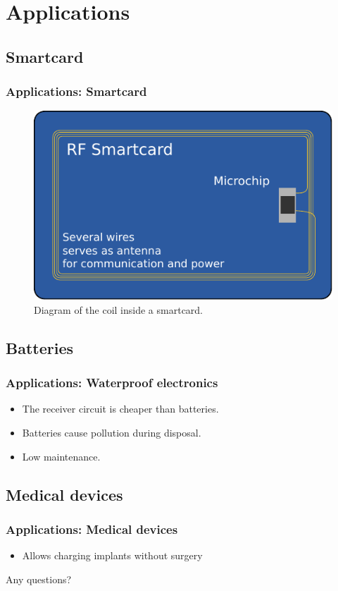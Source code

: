 \documentclass{beamer}
\begin{document}
\section{Applications}

\subsection{Smartcard}
\begin{frame}
  \frametitle{Applications: Smartcard}
    \begin{figure}
      \includegraphics[scale=0.75]{images/smartcard.pdf}
      \caption{Diagram of the coil inside a smartcard. \textcite{wikiRIC}}
    \end{figure}
\end{frame}

\subsection{Batteries}
\begin{frame}
  \frametitle{Applications: Waterproof electronics}
  \begin{itemize}
    \item The receiver circuit is cheaper than batteries.
    \item Batteries cause pollution during disposal.
    \item Low maintenance.
  \end{itemize}

\end{frame}

\subsection{Medical devices}
\begin{frame}
  \frametitle{Applications: Medical devices}
  \begin{itemize}
    \item Allows charging implants without surgery
  \end{itemize}
\end{frame}

\begin{frame}
  \center
  \begin{block}{Any questions?}
  \end{block}
\end{frame}
\end{document}

